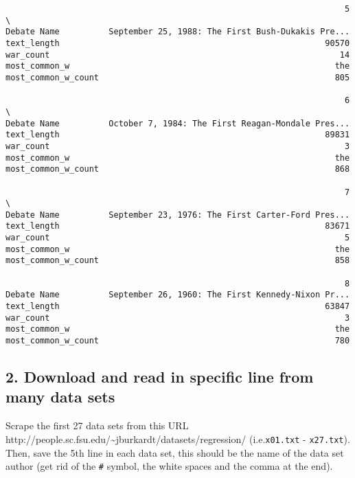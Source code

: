 \documentclass[11pt]{article}
\begin{document}
\begin{verbatim}
                                                                     5  \
Debate Name          September 25, 1988: The First Bush-Dukakis Pre...   
text_length                                                      90570   
war_count                                                           14   
most_common_w                                                      the   
most_common_w_count                                                805   

                                                                     6  \
Debate Name          October 7, 1984: The First Reagan-Mondale Pres...   
text_length                                                      89831   
war_count                                                            3   
most_common_w                                                      the   
most_common_w_count                                                868   

                                                                     7  \
Debate Name          September 23, 1976: The First Carter-Ford Pres...   
text_length                                                      83671   
war_count                                                            5   
most_common_w                                                      the   
most_common_w_count                                                858   

                                                                     8  
Debate Name          September 26, 1960: The First Kennedy-Nixon Pr...  
text_length                                                      63847  
war_count                                                            3  
most_common_w                                                      the  
most_common_w_count                                                780  
    \end{verbatim}

    
    \hypertarget{download-and-read-in-specific-line-from-many-data-sets}{%
\subsection{2. Download and read in specific line from many data
sets}\label{download-and-read-in-specific-line-from-many-data-sets}}

Scrape the first 27 data sets from this URL
http://people.sc.fsu.edu/\textasciitilde{}jburkardt/datasets/regression/
(i.e.\texttt{x01.txt} - \texttt{x27.txt}). Then, save the 5th line in
each data set, this should be the name of the data set author (get rid
of the \texttt{\#} symbol, the white spaces and the comma at the end).
\end{document}
